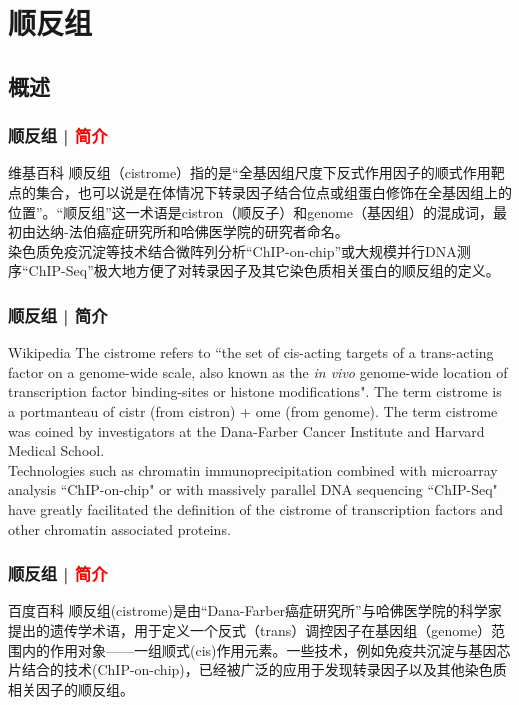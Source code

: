 \section{顺反组}
\subsection{概述}
\begin{frame}
  \frametitle{顺反组 | \textcolor{red}{简介}}
  \begin{block}{维基百科}
顺反组（cistrome）指的是“全基因组尺度下反式作用因子的顺式作用靶点的集合，也可以说是在体情况下转录因子结合位点或组蛋白修饰在全基因组上的位置”。“顺反组”这一术语是cistron（顺反子）和genome（基因组）的混成词，最初由达纳-法伯癌症研究所和哈佛医学院的研究者命名。\\
\vspace{0.3em}
    染色质免疫沉淀等技术结合微阵列分析“ChIP-on-chip”或大规模并行DNA测序“ChIP-Seq”极大地方便了对转录因子及其它染色质相关蛋白的顺反组的定义。
  \end{block}
\end{frame}

\begin{frame}
  \frametitle{顺反组 | 简介}
  \begin{block}{Wikipedia}
    The cistrome refers to ``the set of cis-acting targets of a trans-acting factor on a genome-wide scale, also known as the \textit{in vivo} genome-wide location of transcription factor binding-sites or histone modifications". The term cistrome is a portmanteau of cistr (from cistron) + ome (from genome). The term cistrome was coined by investigators at the Dana-Farber Cancer Institute and Harvard Medical School.\\
\vspace{0.3em}
    Technologies such as chromatin immunoprecipitation combined with microarray analysis ``ChIP-on-chip" or with massively parallel DNA sequencing ``ChIP-Seq" have greatly facilitated the definition of the cistrome of transcription factors and other chromatin associated proteins.
  \end{block}
\end{frame}

\begin{frame}
  \frametitle{顺反组 | \textcolor{red}{简介}}
  \begin{block}{百度百科}
    顺反组(cistrome)是由“Dana-Farber癌症研究所”与哈佛医学院的科学家提出的遗传学术语，用于定义一个反式（trans）调控因子在基因组（genome）范围内的作用对象——一组顺式(cis)作用元素。一些技术，例如免疫共沉淀与基因芯片结合的技术(ChIP-on-chip)，已经被广泛的应用于发现转录因子以及其他染色质相关因子的顺反组。
  \end{block}
\end{frame}

